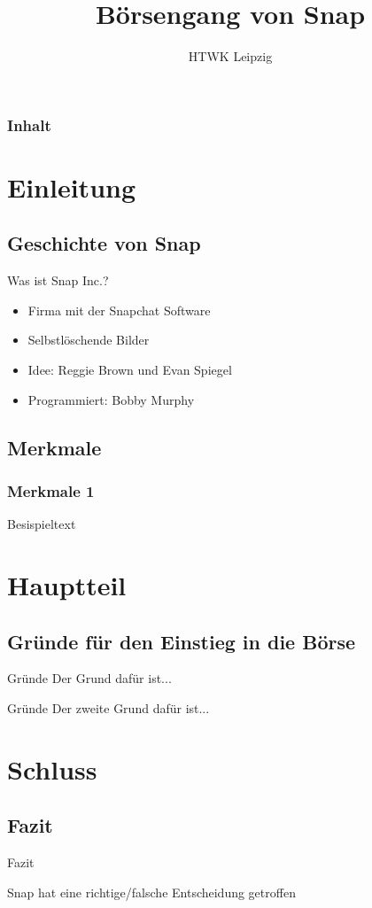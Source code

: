 \documentclass{beamer}
\title{Börsengang von Snap}
\institute{Alex Dudin, Hendrik Schick, Andre Hildebrandt}
\author[]{HTWK Leipzig} %
\begin{document}
\begin{frame}
\titlepage
\end{frame}

\begin{frame}
\frametitle{Inhalt}
\tableofcontents
\end{frame}

\section{Einleitung}

\subsection{Geschichte von Snap}
\begin{frame} {Was ist Snap Inc.?}
\begin{itemize}
\item Firma mit der Snapchat Software 
\item  Selbstlöschende Bilder
\item  Idee: Reggie Brown und Evan Spiegel
\item  Programmiert: Bobby Murphy
\end{itemize}
\end{frame}

\subsection{Merkmale}

\begin{frame}
\frametitle{Merkmale 1}

Besispieltext

\end{frame}




\section{Hauptteil}
\subsection{Gründe für den Einstieg in die Börse}
\begin{frame} {Gründe}
	Der Grund dafür ist...
\end{frame}

\begin{frame} {Gründe}
Der zweite Grund dafür ist...
\end{frame}


\section{Schluss}
\subsection{Fazit}
\begin{frame}{Fazit}

Snap hat eine richtige/falsche Entscheidung getroffen

\end{frame}
\end{document}
